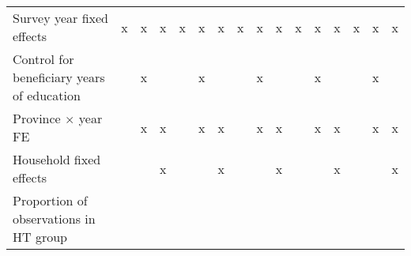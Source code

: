 {\begin{tabular}{l*{15}{c}}
Survey year fixed effects&           x         &           x         &           x         &           x         &           x         &           x         &           x         &           x         &           x         &           x         &           x         &           x         &           x         &           x         &           x         \\
Control for beneficiary years of education&                     &           x         &                     &                     &           x         &                     &                     &           x         &                     &                     &           x         &                     &                     &           x         &                     \\
Province $\times$  year FE&                     &           x         &           x         &                     &           x         &           x         &                     &           x         &           x         &                     &           x         &           x         &                     &           x         &           x         \\
Household fixed effects&                     &                     &           x         &                     &                     &           x         &                     &                     &           x         &                     &                     &           x         &                     &                     &           x         \\
Proportion of observations in HT group&                     &                     &                     &                     &                     &                     &                     &                     &                     &                     &                     &                     &                     &                     &                     \\
\bottomrule
\end{tabular}
}
